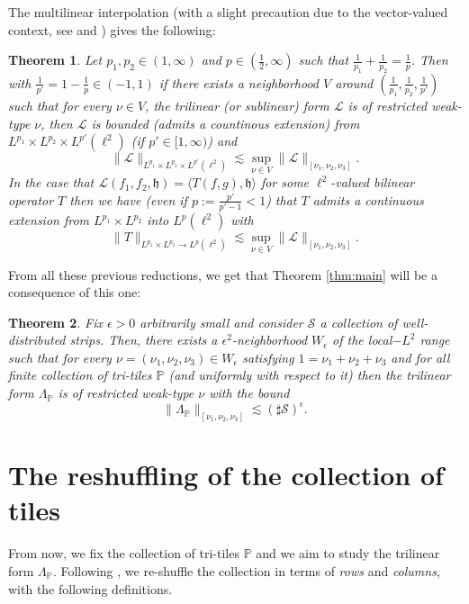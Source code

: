 \documentclass[a4paper,11pt,oneside]{amsart}
\newcommand{\hh}{\mathfrak{h}}
\newcommand{\PP}{\mathbb{P}}
\theoremstyle{plain}
\newtheorem{theorem}{Theorem}[section]
\theoremstyle{definition}
\begin{document}
The multilinear interpolation (with a slight precaution due to the vector-valued context, see \cite[Section 2.2]{TheseCristina} and \cite[Section 2.3]{BeneaMuscalu}) gives the following:

\begin{theorem} Let $p_1,p_2\in(1,\infty)$ and $p\in(\frac{1}{2},\infty)$ such that $\frac{1}{p_1}+\frac{1}{p_2}=\frac{1}{p}$.
Then with $\frac{1}{p'}=1-\frac{1}{p}\in(-1,1)$ if there exists a neighborhood $V$ around $(\frac{1}{p_1},\frac{1}{p_2},\frac{1}{p'})$ such that for every $\nu\in V$, the trilinear (or sublinear) form ${\mathcal L}$ is of restricted weak-type $\nu$, then ${\mathcal L}$ is bounded (admits a countinous  extension) from $L^{p_1}\times L^{p_2} \times L^{p'}(\ell^2)$ (if $p'\in[1,\infty)$) and
$$ \|{\mathcal L}\|_{L^{p_1} \times L^{p_2} \times L^{p'}(\ell^2)} \lesssim \sup_{\nu\in V} \|{\mathcal L}\|_{[\nu_1,\nu_2,\nu_3]}.$$
In the case that ${\mathcal L}(f_1,f_2,\hh)=\langle T(f,g),\hh\rangle$ for some $\ell^2$-valued bilinear operator $T$ then we have (even if $p:=\frac{p'}{p'-1}<1$) that $T$ admits a continuous extension from $L^{p_1} \times L^{p_2}$ into $L^{p}(\ell^2)$ with
$$ \|T\|_{L^{p_1} \times L^{p_2} \to L^{p}(\ell^2)} \lesssim \sup_{\nu\in V} \|{\mathcal L}\|_{[\nu_1,\nu_2,\nu_3]}.$$
\end{theorem}

From all these previous reductions, we get that Theorem \ref{thm:main} will be a consequence of this one:

\begin{theorem} \label{thm:main:reduc} Fix $\epsilon>0$ arbitrarily small and consider ${\mathcal S}$ a collection of {\it well-distributed} strips. Then, there exists a $\epsilon^2$-neighborhood $W_{\epsilon}$ of the local$-L^2$ range such that for every $\nu=(\nu_1,\nu_2,\nu_3)\in W_{\epsilon}$ satisfying $1=\nu_1+\nu_2+\nu_3$ and for all finite collection of tri-tiles $\PP$ (and uniformly with respect to it) then the trilinear form $\Lambda_{\PP}$ is of restricted weak-type $\nu$ with the bound
$$ \|\Lambda_{\PP}\|_{[\nu_1,\nu_2,\nu_3]} \lesssim (\sharp \mathcal S)^{\epsilon}.$$
\end{theorem}


\section{The reshuffling of the  collection of tiles}

From now, we fix the collection of tri-tiles $\PP$ and we aim to study the trilinear form $\Lambda_{\PP}$. Following \cite{BB}, we re-shuffle the collection in terms of {\it rows} and {\it columns}, with the following definitions.
\end{document}
